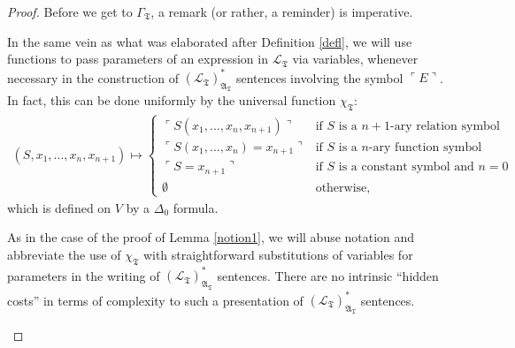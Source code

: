 \documentclass[12pt]{article}
\numberwithin{equation}{section}
\begin{document}
\begin{proof}
Before we get to $\Gamma_{\mathfrak{T}}$, a remark (or rather, a reminder) is imperative.

\begin{rem}\label{subsafe2}
In the same vein as what was elaborated after Definition \ref{defl}, we will use functions to pass parameters of an expression in $\mathcal{L}_{\mathfrak{T}}$ via variables, whenever necessary in the construction of $({\mathcal{L}_{\mathfrak{T}}})^*_{\mathfrak{A}_{\mathfrak{T}}}$ sentences involving the symbol $\ulcorner E \urcorner$. In fact, this can be done uniformly by the universal function $\chi_{\mathfrak{T}}$: 
\begin{align*}
    (S, x_1, ..., x_n, x_{n+1}) \mapsto 
    \begin{cases}
        \ulcorner S(x_1, ..., x_n, x_{n+1}) \urcorner & \text{if } S \text{ is a } n+1 \text{-ary relation symbol} \\
        \ulcorner S(x_1, ..., x_n) = x_{n+1} \urcorner & \text{if } S \text{ is a } n \text{-ary function symbol }\\
        \ulcorner S = x_{n+1} \urcorner & \text{if } S \text{ is a } \text{constant symbol and } n = 0 \\
        \emptyset & \text{otherwise},
    \end{cases}
\end{align*}
which is defined on $V$ by a $\Delta_0$ formula.

As in the case of the proof of Lemma \ref{notion1}, we will abuse notation and abbreviate the use of $\chi_{\mathfrak{T}}$ with straightforward substitutions of variables for parameters in the writing of $({\mathcal{L}_{\mathfrak{T}}})^*_{\mathfrak{A}_{\mathfrak{T}}}$ sentences. There are no intrinsic ``hidden costs'' in terms of complexity to such a presentation of $({\mathcal{L}_{\mathfrak{T}}})^*_{\mathfrak{A}_{\mathfrak{T}}}$ sentences.
\end{rem}


\end{proof}
\end{document}
